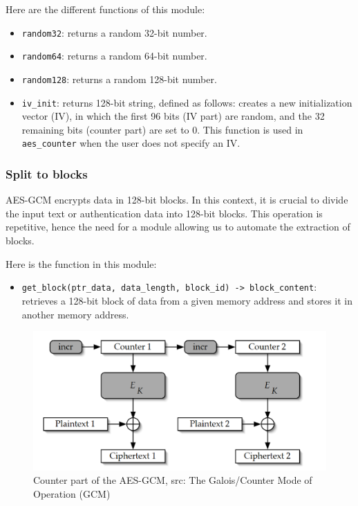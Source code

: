 \documentclass[runningheads]{llncs}
\begin{document}
Here are the different functions of this module:
\begin{itemize}
    \item \texttt{random32}: returns a random 32-bit number.
    \item \texttt{random64}: returns a random 64-bit number.
    \item \texttt{random128}: returns a random 128-bit number.
    \item \texttt{iv\_init}: returns 128-bit string, defined as follows: creates a new initialization vector (IV), in which the first 96 bits (IV part) are random, and the 32 remaining bits (counter part) are set to 0. This function is used in \texttt{aes\_counter} when the user does not specify an IV.
\end{itemize}

\subsubsection{Split to blocks}

AES-GCM encrypts data in 128-bit blocks. In this context, it is crucial to divide the input text or authentication data into 128-bit blocks. This operation is repetitive, hence the need for a module allowing us to automate the extraction of blocks.

Here is the function in this module:
\begin{itemize}
    \item \texttt{get\_block(ptr\_data, data\_length, block\_id) -> block\_content}: retrieves a 128-bit block of data from a given memory address and stores it in another memory address.
\end{itemize}

\begin{figure}[ht] %
    \centering
    \includegraphics[scale=0.65]{resources/AES_counter.png}
    \caption{Counter part of the AES-GCM, src: The Galois/Counter Mode of Operation (GCM)~\cite{GCM_NIST}}
\end{figure}
\end{document}
